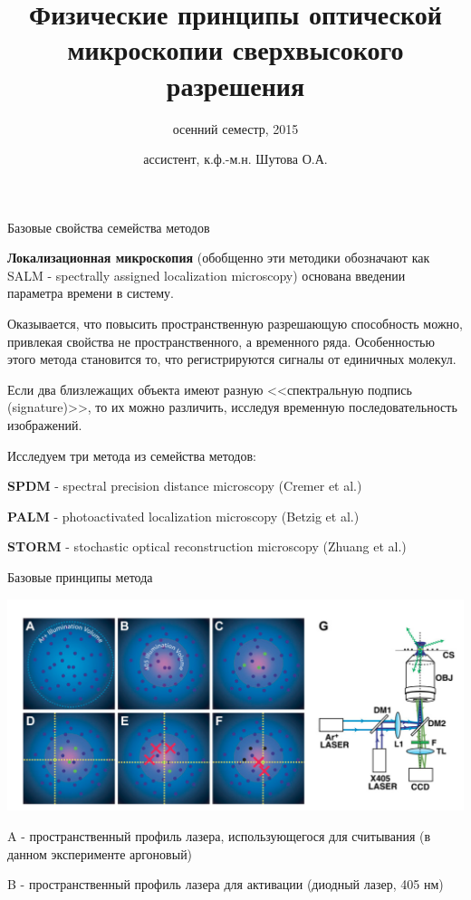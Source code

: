 \documentclass[9pt, compress, xcolor=table]{beamer}
\title{Физические принципы оптической микроскопии сверхвысокого разрешения}
\subtitle{осенний семестр, 2015}
\author{ассистент, к.ф.-м.н. Шутова О.А.}
\institute{МГУ им. М.В. Ломоносова, физический факультет}
\begin{document}
\maketitle


\begin{frame}{Базовые свойства семейства методов}

\textcolor{red!50!black}{\textbf{Локализационная микроскопия}} (обобщенно эти методики обозначают как SALM - spectrally assigned localization microscopy) основана введении параметра времени в систему. 

Оказывается, что повысить пространственную разрешающую способность можно, привлекая свойства не пространственного, а временного ряда. Особенностью этого метода становится то, что регистрируются сигналы от единичных молекул. 

Если два близлежащих объекта имеют разную <<спектральную подпись (signature)>>, то их можно различить, исследуя временную последовательность изображений. 

Исследуем три метода из семейства методов: 

\textbf{SPDM} - spectral precision distance microscopy (Cremer et al.)

\textbf{PALM} - photoactivated localization microscopy (Betzig et al.)

\textbf{STORM} - stochastic optical reconstruction microscopy (Zhuang et al.)


\end{frame}

\begin{frame}{Базовые принципы метода}
\begin{center}
\includegraphics[width=\textwidth]{lm1}
\end{center}


A - пространственный профиль лазера, использующегося для считывания (в данном эксперименте аргоновый)

B - пространственный профиль лазера для активации (диодный лазер, 405 нм)
\end{frame}
\end{document}
